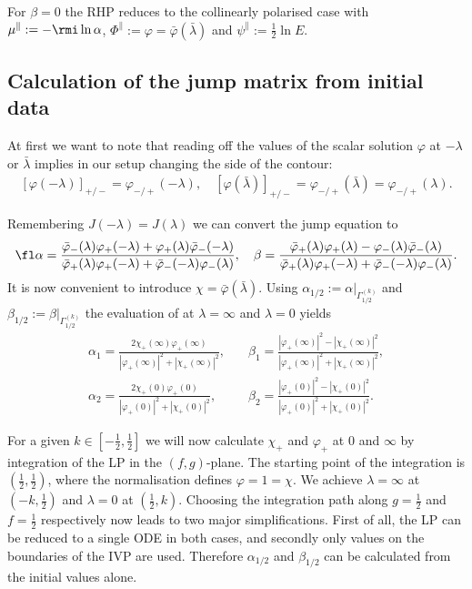 \documentclass[12pt]{iopart}
\begin{document}
For $\beta=0$ the RHP  reduces to the collinearly polarised case   with $\mu^\|:=-\rmi\ln\alpha$, $\Phi^\|:=\varphi=\bar{\varphi}(\bar{\lambda})$ and $\psi^\|:=\frac12\ln E$.




\subsection{Calculation of the jump matrix from initial data}

At first we want to note that reading off the values of the scalar solution $\varphi$ at $-\lambda$ or $\bar{\lambda}$ implies in our setup changing the side of the contour:
\begin{eqnarray}
\left[\varphi(-\lambda)\right]_{+/-}=\varphi_{-/+}(-\lambda), \quad
\left[\varphi(\bar{\lambda})\right]_{+/-}=\varphi_{-/+}(\bar{\lambda})=\varphi_{-/+}(\lambda).
\end{eqnarray}

Remembering $J(-\lambda)=J(\lambda)$ we can convert the jump equation  to
\begin{eqnarray}
\fl\alpha = \frac{\bar{\varphi}_-(\lambda)\varphi_+(-\lambda)+\varphi_+(\lambda)\bar{\varphi}_-(-\lambda)}{\bar{\varphi}_+(\lambda)\varphi_+(-\lambda)+\bar{\varphi}_-(-\lambda)\varphi_-(\lambda)}, \quad
\beta = \frac{\bar{\varphi}_+(\lambda)\varphi_+(\lambda)-\varphi_-(\lambda)\bar{\varphi}_-(\lambda)}{\bar{\varphi}_+(\lambda)\varphi_+(-\lambda)+\bar{\varphi}_-(-\lambda)\varphi_-(\lambda)}. \label{alphabetachi}
\end{eqnarray}
It is now convenient to introduce $\chi=\bar{\varphi}(\bar{\lambda})$. Using $\alpha_{1/2}:=\alpha|_{\Gamma_{1/2}^{(k)}}$ and $\beta_{1/2}:=\beta|_{\Gamma_{1/2}^{(k)}}$ the evaluation of  at $\lambda=\infty$ and $\lambda=0$ yields  
\begin{eqnarray}
\alpha_1 = \frac{2\chi_+(\infty)\varphi_+(\infty)}{|\varphi_+(\infty)|^2+|\chi_+(\infty)|^2}, \quad &
\beta_1 = \frac{|\varphi_+(\infty)|^2-|\chi_+(\infty)|^2}{|\varphi_+(\infty)|^2+|\chi_+(\infty)|^2}, \label{alphabeta1}\\
\alpha_2 = \frac{2\chi_+(0)\varphi_+(0)}{|\varphi_+(0)|^2+|\chi_+(0)|^2}, &
\beta_2 = \frac{|\varphi_+(0)|^2-|\chi_+(0)|^2}{|\varphi_+(0)|^2+|\chi_+(0)|^2}.
\end{eqnarray}

For a given $k\in [-\frac12,\frac12]$ we will now calculate $\chi_+$ and $\varphi_+$ at $0$ and $\infty$ by integration of the LP in the $(f,g)$-plane. The starting point of the integration is $(\frac12,\frac12)$, where the normalisation  defines  $\varphi=1=\chi$. We achieve $\lambda=\infty$ at $(-k,\frac12)$ and $\lambda=0$ at $(\frac12,k)$. Choosing the integration path along $g=\frac12$ and $f=\frac12$ respectively now leads to two major simplifications. First of all, the LP can be reduced to a single ODE in both cases, and secondly only values on the boundaries of the IVP are used. Therefore $\alpha_{1/2}$ and $\beta_{1/2}$ can be calculated from the initial values alone.
\end{document}
